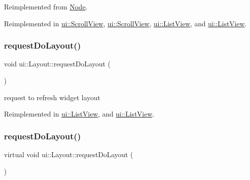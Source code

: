 Reimplemented from \hyperlink{classNode_a872d4a7d389b26b0c6ad7ed99c8b1b65}{Node}.



Reimplemented in \hyperlink{classui_1_1ScrollView_ae3b50790cd7fa0feeacc9204fe86fc1a}{ui\+::\+Scroll\+View}, \hyperlink{classui_1_1ScrollView_a678108e716966e8beccc25c0de1d9b29}{ui\+::\+Scroll\+View}, \hyperlink{classui_1_1ListView_ace4890246e03a8de66cfe9d0312df365}{ui\+::\+List\+View}, and \hyperlink{classui_1_1ListView_a7002fe4ad783aeccf56cebbe4144036e}{ui\+::\+List\+View}.

\mbox{\label{classui_1_1Layout_a972bfe6c80741c99becff44a3f991558}} 
\subsubsection{\texorpdfstring{request\+Do\+Layout()}{requestDoLayout()}\hspace{0.1cm}{\footnotesize\ttfamily [1/2]}}
{\footnotesize\ttfamily void ui\+::\+Layout\+::request\+Do\+Layout (\begin{DoxyParamCaption}{ }\end{DoxyParamCaption})\hspace{0.3cm}{\ttfamily [virtual]}}

request to refresh widget layout 

Reimplemented in \hyperlink{classui_1_1ListView_ab559aec6b481480fad169f2a53094028}{ui\+::\+List\+View}, and \hyperlink{classui_1_1ListView_ad02cdf77d0d8f0dd2586b2bc083d4750}{ui\+::\+List\+View}.

\mbox{\label{classui_1_1Layout_af35d0efa2d078a144a3cd2c119f01f3b}} 
\subsubsection{\texorpdfstring{request\+Do\+Layout()}{requestDoLayout()}\hspace{0.1cm}{\footnotesize\ttfamily [2/2]}}
{\footnotesize\ttfamily virtual void ui\+::\+Layout\+::request\+Do\+Layout (\begin{DoxyParamCaption}{ }\end{DoxyParamCaption})\hspace{0.3cm}{\ttfamily [virtual]}}

